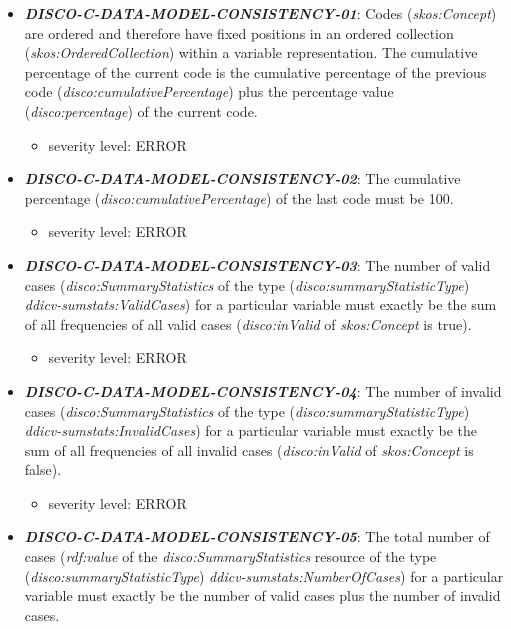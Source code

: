 \documentclass{llncs}
\begin{document}
\begin{itemize}
	\item \textbf{{\em DISCO-C-DATA-MODEL-CONSISTENCY-01}}: 
	Codes (\emph{skos:Concept}) are ordered and therefore have fixed positions in an ordered collection (\emph{skos:OrderedCollection}) within a variable representation.
	The cumulative percentage of the current code is the cumulative percentage of the previous code (\emph{disco:cumulativePercentage})
	plus the percentage value (\emph{disco:percentage}) of the current code. 
		\begin{itemize}
		\item severity level: ERROR
	\end{itemize}
	\item \textbf{{\em DISCO-C-DATA-MODEL-CONSISTENCY-02}}: 
	The cumulative percentage (\emph{disco:cumulativePercentage}) of the last code must be 100. 
		\begin{itemize}
		\item severity level: ERROR
	\end{itemize}
	\item \textbf{{\em DISCO-C-DATA-MODEL-CONSISTENCY-03}}: 
	The number of valid cases (\emph{disco:SummaryStatistics} of the type (\emph{disco:summaryStatisticType}) \emph{ddicv-sumstats:ValidCases}) 
	for a particular variable must exactly be the sum of all frequencies of all valid cases (\emph{disco:inValid} of \emph{skos:Concept} is true).
		\begin{itemize}
		\item severity level: ERROR
	\end{itemize}
	\item \textbf{{\em DISCO-C-DATA-MODEL-CONSISTENCY-04}}: 
	The number of invalid cases (\emph{disco:SummaryStatistics} of the type (\emph{disco:summaryStatisticType}) \emph{ddicv-sumstats:InvalidCases})
	for a particular variable must exactly be the sum of all frequencies of all invalid cases (\emph{disco:inValid} of \emph{skos:Concept} is false).
		\begin{itemize}
		\item severity level: ERROR
	\end{itemize}
	\item \textbf{{\em DISCO-C-DATA-MODEL-CONSISTENCY-05}}: 
	The total number of cases (\emph{rdf:value} of the \emph{disco:SummaryStatistics} resource of the type (\emph{disco:summaryStatisticType}) \emph{ddicv-sumstats:NumberOfCases}) 
	for a particular variable must exactly be the number of valid cases plus the number of invalid cases.

\end{itemize}
\end{document}
